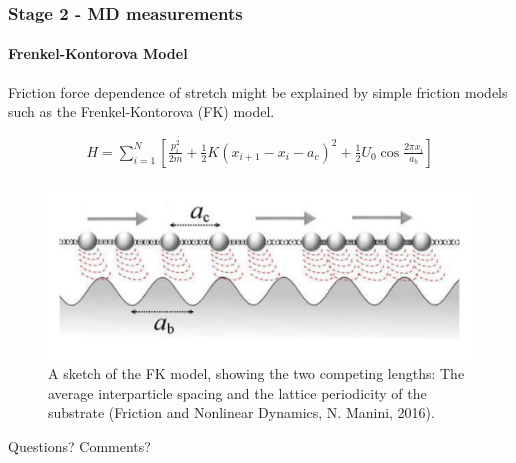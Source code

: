 \documentclass[
	10pt, %
]{beamer}
\begin{document}
\begin{frame}
	\frametitle{Stage 2 - MD measurements}
	\framesubtitle{Frenkel-Kontorova Model}

	Friction force dependence of stretch might be explained by simple friction models such as the Frenkel-Kontorova (FK) model.

	\begin{align*}
		H=\sum_{i=1}^N\left[\frac{p_i^2}{2 m}+\frac{1}{2} K\left(x_{i+1}-x_i-a_c\right)^2+\frac{1}{2} U_0 \cos \frac{2 \pi x_i}{a_b}\right]
	\end{align*}
	\begin{figure}
		\includegraphics[width=0.65\linewidth]{figures/FK_model.png}
		\caption{A sketch of the FK model, showing the two competing lengths: The average interparticle spacing and the lattice periodicity of the substrate (Friction and Nonlinear Dynamics, N. Manini, 2016).}
	\end{figure}

\end{frame}




\begin{frame}[plain] %
	\begin{center}
		{\LARGE Questions? Comments?}
	\end{center}
\end{frame}


		
		





\end{document}
